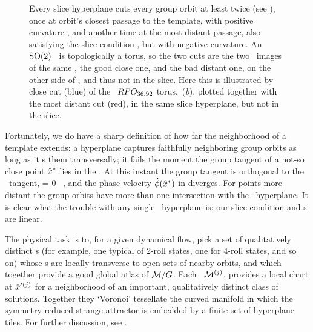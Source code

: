 \begin{figure}
   \centering
   \caption{\label{fig:sliceimage}
      Every slice hyperplane cuts every group orbit at least twice (see
      ), once at       orbit's closest passage to the
      template, with positive curvature ,   and another
      time at the most distant passage, also satisfying the slice
      condition , but with negative curvature. An
      $\textrm{SO}(2)$ \rpo\ is topologically a torus, so the two cuts are the
      two \po\ images of the same \rpo, the good close one, and the bad
      distant one, on the other side of {\sset}, and thus not in the
      slice. Here this is illustrated by close cut (blue) of the \rpo\
      $RPO_{36.92}$ torus, \,({\it b}),
      plotted together with the most distant cut (red), in the same slice
      hyperplane, but not in the slice.
   }
\end{figure}


Fortunately, we do have a sharp definition of how far the neighborhood
of a template extends:
a hyperplane captures faithfully neighboring group orbits as long
as it \slice s them transversally; it fails the moment the group tangent of
a not-so close point $\hat{x}^\ast$ lies in the \slice.
At this instant the group tangent is orthogonal to the \slice\ tangent,
\beq
\braket{\groupTan(\sspRSing)}{\sliceTan{}}= 0
\, ,
%
and the phase velocity $\dot{{\bf \phi}}(\hat{x}^\ast)$ in 
diverges.  For points more distant the group orbits have more than one
intersection with the \slice\ hyperplane. It is clear what the trouble
with any single \slice\ hyperplane is: our slice condition and \slice s
are linear.

The physical task is to, for a given dynamical flow, pick a set of
qualitatively distinct {\template s} (for example, one typical of 2-roll
states, one for 4-roll states, and so on) whose \slice s  are locally
transverse to open sets of nearby orbits, and which together provide a
good global atlas of ${\cal M}/G$. Each \slice\ ${\cal M}{}^{(j)}$, provides a
local chart at ${\hat{x}'}{}^{(j)}$ for a neighborhood of an important,
qualitatively distinct class of solutions. Together they `Voronoi'
tessellate  the curved manifold in which the symmetry-reduced strange
attractor is embedded by a finite set of hyperplane tiles.
For further discussion, see .

